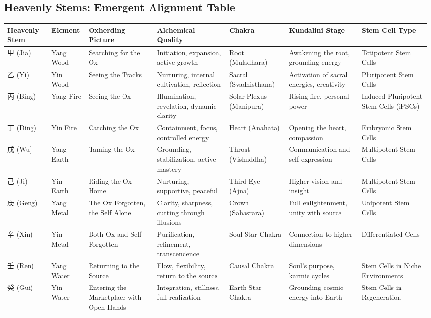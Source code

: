 \documentclass{article}
\begin{document}
\begin{landscape}

\section*{Heavenly Stems: Emergent Alignment Table}

\renewcommand{\arraystretch}{1.5}

\begin{longtable}{|p{2.8cm}|p{2.5cm}|p{3.8cm}|p{3.8cm}|p{2.5cm}|p{3.5cm}|p{3.8cm}|}
\hline
\textbf{Heavenly Stem} 
& \textbf{Element} 
& \textbf{Oxherding Picture} 
& \textbf{Alchemical Quality} 
& \textbf{Chakra} 
& \textbf{Kundalini Stage} 
& \textbf{Stem Cell Type} \\
\hline
甲 (Jia) 
& Yang Wood 
& Searching for the Ox 
& Initiation, expansion, active growth 
& Root (Muladhara) 
& Awakening the root, grounding energy 
& Totipotent Stem Cells \\
乙 (Yi) 
& Yin Wood 
& Seeing the Tracks 
& Nurturing, internal cultivation, reflection 
& Sacral (Svadhisthana) 
& Activation of sacral energies, creativity 
& Pluripotent Stem Cells \\
丙 (Bing) 
& Yang Fire 
& Seeing the Ox 
& Illumination, revelation, dynamic clarity 
& Solar Plexus (Manipura) 
& Rising fire, personal power 
& Induced Pluripotent Stem Cells (iPSCs) \\
丁 (Ding) 
& Yin Fire 
& Catching the Ox 
& Containment, focus, controlled energy 
& Heart (Anahata) 
& Opening the heart, compassion 
& Embryonic Stem Cells \\
戊 (Wu) 
& Yang Earth 
& Taming the Ox 
& Grounding, stabilization, active mastery 
& Throat (Vishuddha) 
& Communication and self-expression 
& Multipotent Stem Cells \\
己 (Ji) 
& Yin Earth 
& Riding the Ox Home 
& Nurturing, supportive, peaceful 
& Third Eye (Ajna) 
& Higher vision and insight 
& Multipotent Stem Cells \\
庚 (Geng) 
& Yang Metal 
& The Ox Forgotten, the Self Alone 
& Clarity, sharpness, cutting through illusions 
& Crown (Sahasrara) 
& Full enlightenment, unity with source 
& Unipotent Stem Cells \\
辛 (Xin) 
& Yin Metal 
& Both Ox and Self Forgotten 
& Purification, refinement, transcendence 
& Soul Star Chakra 
& Connection to higher dimensions 
& Differentiated Cells \\
壬 (Ren) 
& Yang Water 
& Returning to the Source 
& Flow, flexibility, return to the source 
& Causal Chakra 
& Soul's purpose, karmic cycles 
& Stem Cells in Niche Environments \\
癸 (Gui) 
& Yin Water 
& Entering the Marketplace with Open Hands 
& Integration, stillness, full realization 
& Earth Star Chakra 
& Grounding cosmic energy into Earth 
& Stem Cells in Regeneration \\
\hline
\end{longtable}

\end{landscape}
\end{document}
